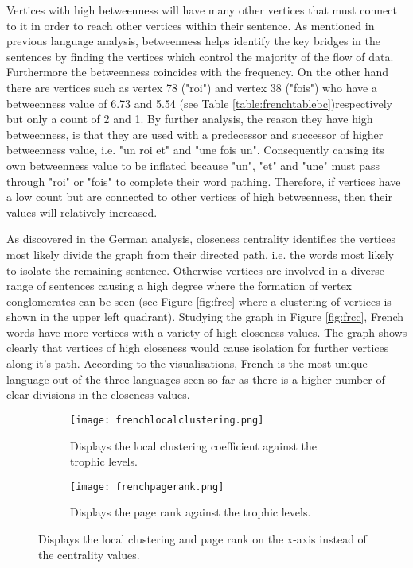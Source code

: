 Vertices with high betweenness will have many other vertices that must connect to it in order to reach other vertices within their sentence. As mentioned in previous language analysis, betweenness helps identify the key bridges in the sentences by finding the vertices which control the majority of the flow of data. Furthermore the betweenness coincides with the frequency. On the other hand there are vertices such as vertex 78 ("roi") and vertex 38 ("fois") who have a betweenness value of 6.73 and 5.54 (see Table \ref{table:frenchtablebc})respectively but only a count of 2 and 1. By further analysis, the reason they have high betweenness, is that they are used with a predecessor and successor of higher betweenness value, i.e. "un roi et" and "une fois un". Consequently causing its own betweenness value to be inflated because "un", "et" and "une" must pass through "roi" or "fois" to complete their word pathing. Therefore, if vertices have a low count but are connected to other vertices of high betweenness, then their values will relatively increased.

As discovered in the German analysis, closeness centrality identifies the vertices most likely divide the graph from their directed path, i.e. the words most likely to isolate the remaining sentence. Otherwise vertices are involved in a diverse range of sentences causing a high degree where the formation of vertex conglomerates can be seen (see Figure \ref{fig:frcc} where a clustering of vertices is shown in the upper left quadrant). Studying the graph in Figure \ref{fig:frcc}, French words have more vertices with a variety of high closeness values. The graph shows clearly that vertices of high closeness would cause isolation for further vertices along it's path. According to the visualisations, French is the most unique language out of the three languages seen so far as there is a higher number of clear divisions in the closeness values.

\begin{figure}[H]
\centering
\begin{subfigure}{.45\textwidth}
	\hspace{-1cm} 
	\texttt{[image: frenchlocalclustering.png]}
	\caption{Displays the local clustering coefficient against the trophic levels.}
	\label{fig:frlc}
\end{subfigure}
\hfill
\begin{subfigure}{.45\textwidth}
	\hspace{-1cm} 
	\texttt{[image: frenchpagerank.png]}
	\caption{Displays the page rank against the trophic levels.}
	\label{fig:frpr}
\end{subfigure}
\caption{Displays the local clustering and page rank on the x-axis instead of the centrality values.}
\label{fig:frother}
\end{figure}

